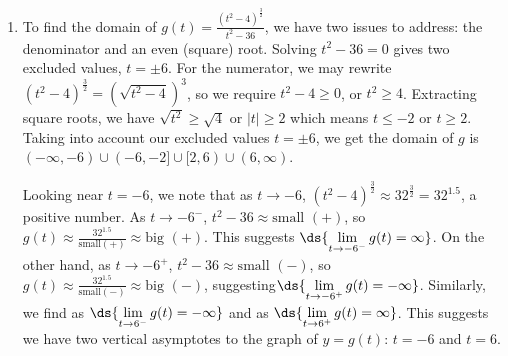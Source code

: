 \documentclass{ximera}
\begin{document}
\begin{example}
\begin{enumerate}
Graphing $y=f(x)$ below on the right bears out our analysis regarding zeros and asymptotes.  The range appears to be $[0, \infty)$, with the graph of $y = f(x)$ crossing its horizontal asymptote between $x=1$ and $x=2$.    We see we have  a single local minimum at $(0,0)$ with $f$ is decreasing on $(-\infty, 0]$ and $(2, \infty)$ and increasing on $[0, 2)$.  

For the  sign diagram, we note that $f$ has only one zero, $x=0$ and is undefined at $x = 2$.  For all $x$ values between these two numbers, $f(x) > 0$ or $(+)$.  Our  sign diagram for $f(x)$ is below on the right.

\begin{image}
% 



\end{image} 

\begin{center}
\end{center}


\item To find the domain of $g(t) = \frac{ (t^2-4)^{\frac{3}{2}} }{t^2-36}$, we have two issues to address:  the denominator and an even (square) root.  Solving $t^2 - 36 = 0$ gives  two excluded values, $t = \pm 6$.  For the numerator, we may rewrite $(t^2-4)^{\frac{3}{2}} = (\sqrt{t^2-4})^3$, so we require $t^2-4 \geq 0$, or  $t^2 \geq 4$.  Extracting square roots, we have $\sqrt{t^2} \geq \sqrt{4}$ or $|t| \geq 2$ which means $t \leq -2$ or $t \geq 2$.  Taking into account our excluded values $t = \pm 6$, we get  the domain of $g$ is $(-\infty, -6) \cup (-6, -2] \cup [2, 6) \cup (6, \infty)$.

Looking near $t = -6$, we note that as $t \rightarrow -6$, $(t^2-4)^{\frac{3}{2}} \approx 32^{\frac{3}{2}} = 32^{1.5}$, a positive number.  As $t \rightarrow -6^{-}$, $t^2-36 \approx \text{small $(+)$}$, so $g(t) \approx \frac{32^{1.5}}{\text{small$(+)$}} \approx \text{big $(+)$}$.  This suggests $\ds{\lim_{t \rightarrow -6^{-}} g(t) =\infty}$.  On the other hand, as $t \rightarrow -6^{+}$, $t^2 -36 \approx \text{small $(-)$}$, so $g(t) \approx \frac{32^{1.5}}{\text{small$(-)$}} \approx \text{big $(-)$}$, suggesting$\ds{\lim_{t \rightarrow -6^{+}} g(t) = -\infty}$. Similarly, we find as  $\ds{\lim_{t \rightarrow 6^{-}} g(t) = -\infty}$ and as  $\ds{\lim_{t \rightarrow 6^{+}} g(t) = \infty}$.  This suggests we have two vertical asymptotes to the graph of $y = g(t)$:  $t = -6$ and $t = 6$.


\end{enumerate}
\end{example}
\end{document}
